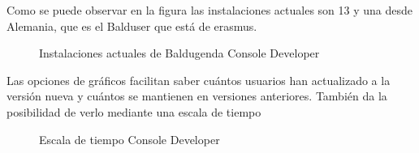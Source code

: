 Como se puede observar en la figura las instalaciones actuales son 13 y una desde Alemania, que es el Balduser que está de erasmus.

\begin{figure}[H] 
  \begin{center} 
    \caption{Instalaciones actuales de Baldugenda Console Developer} 
    \label{fig:InstalacionesActuales} 
  \end{center} 
\end{figure}

Las opciones de gráficos facilitan saber cuántos usuarios han actualizado a la versión nueva y cuántos se mantienen en versiones anteriores.
También da la posibilidad de verlo mediante una escala de tiempo


\begin{figure}[H] 
  \begin{center} 
    \caption{Escala de tiempo Console Developer} 
    \label{fig:EscalaTiempo} 
  \end{center} 
\end{figure}

